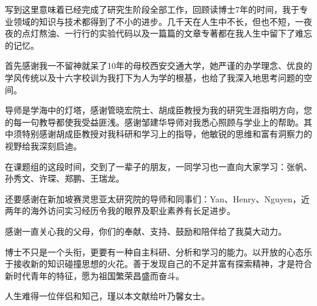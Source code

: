 


写到这里意味着已经完成了研究生阶段全部工作，回顾读博士7年的时间，我于专业领域的知识与技术都得到了不小的进步。几千天在人生中不长，但也不短，一夜夜的点灯熬油、一行行的实验代码以及一篇篇的文章专著都在我人生中留下了难忘的记忆。


首先感谢我一不留神就呆了10年的母校西安交通大学，她严谨的办学理念、优良的学风传统以及十六字校训为我打下为人为学的根基，也给了我深入地思考问题的空间。

导师是学海中的灯塔，感谢管晓宏院士、胡成臣教授为我的研究生涯指明方向，您的每一句教导都使我受益匪浅。感谢邹建华导师对我悉心照顾与学业上的帮助。其中须特别感谢胡成臣教授对我科研和学习上的指导，他敏锐的思维和富有洞察力的视野给我深刻启迪。

在课题组的这段时间，交到了一辈子的朋友，一同学习也一直向大家学习：张帆、孙秀文、许琛、郑鹏、王瑞龙。

还要感谢在新加坡赛灵思亚太研究院的导师和同事们：Yan、Henry、Nguyen，近两年的海外访问实习经历令我的眼界及职业素养有长足进步。

感谢一直关心我的父母，你们的奉献、支持、鼓励和陪伴给了我莫大动力。

博士不只是一个头衔，更要有一种自主科研、分析和学习的能力。以开放的心态乐于接收新的知识碰撞思想的火花。善于发现自己的不足并富有探索精神，才是符合新时代青年的特征，愿为祖国繁荣昌盛而奋斗。

人生难得一位伴侣和知己，瑾以本文献给叶乃馨女士。


